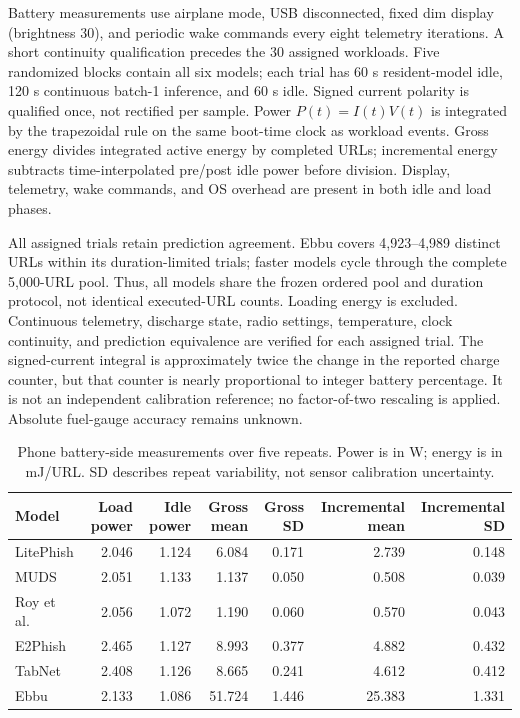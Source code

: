 \documentclass[10pt]{article}
\newenvironment{bluechange}{\color{black}}{}
\begin{document}
\begin{bluechange}
Battery measurements use airplane mode, USB disconnected, fixed dim display (brightness 30), and periodic wake commands every eight telemetry iterations. A short continuity qualification precedes the 30 assigned workloads. Five randomized blocks contain all six models; each trial has 60 s resident-model idle, 120 s continuous batch-1 inference, and 60 s idle. Signed current polarity is qualified once, not rectified per sample. Power $P(t)=I(t)V(t)$ is integrated by the trapezoidal rule on the same boot-time clock as workload events. Gross energy divides integrated active energy by completed URLs; incremental energy subtracts time-interpolated pre/post idle power before division. Display, telemetry, wake commands, and OS overhead are present in both idle and load phases.

All assigned trials retain prediction agreement. Ebbu covers 4,923--4,989 distinct URLs within its duration-limited trials; faster models cycle through the complete 5,000-URL pool. Thus, all models share the frozen ordered pool and duration protocol, not identical executed-URL counts. Loading energy is excluded. Continuous telemetry, discharge state, radio settings, temperature, clock continuity, and prediction equivalence are verified for each assigned trial. The signed-current integral is approximately twice the change in the reported charge counter, but that counter is nearly proportional to integer battery percentage. It is not an independent calibration reference; no factor-of-two rescaling is applied. Absolute fuel-gauge accuracy remains unknown.
\end{bluechange}
\begin{table}[ht]
\centering\color{black}\small
\caption{Phone battery-side measurements over five repeats. Power is in W; energy is in mJ/URL. SD describes repeat variability, not sensor calibration uncertainty.}

\begin{tabular}{lrrrrrr}
\toprule
Model & Load power & Idle power & Gross mean & Gross SD & Incremental mean & Incremental SD \\
\midrule
LitePhish & 2.046 & 1.124 & 6.084 & 0.171 & 2.739 & 0.148 \\
MUDS & 2.051 & 1.133 & 1.137 & 0.050 & 0.508 & 0.039 \\
Roy et al. & 2.056 & 1.072 & 1.190 & 0.060 & 0.570 & 0.043 \\
E2Phish & 2.465 & 1.127 & 8.993 & 0.377 & 4.882 & 0.432 \\
TabNet & 2.408 & 1.126 & 8.665 & 0.241 & 4.612 & 0.412 \\
Ebbu & 2.133 & 1.086 & 51.724 & 1.446 & 25.383 & 1.331 \\
\bottomrule
\end{tabular}
\end{table}
\end{document}
